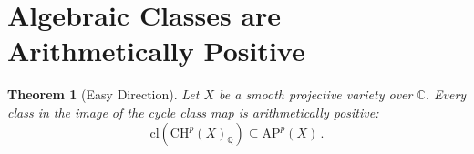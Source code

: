 \documentclass[aps,prd,twocolumn,superscriptaddress,nofootinbib]{revtex4-2}
\newtheorem{theorem}{Theorem}[section]
\theoremstyle{definition}
\theoremstyle{remark}
\begin{document}
\section{Algebraic Classes are Arithmetically Positive}
\label{sec:easy_direction}

\begin{theorem}[Easy Direction]
\label{thm:easy_direction}
Let $X$ be a smooth projective variety over $\mathbb{C}$. Every class in the image of the cycle class map is arithmetically positive:
\begin{equation}
\mathrm{cl}\!\left(\mathrm{CH}^p(X)_\mathbb{Q}\right) \subseteq \mathrm{AP}^p(X)\,.
\end{equation}
\end{theorem}
\end{document}
